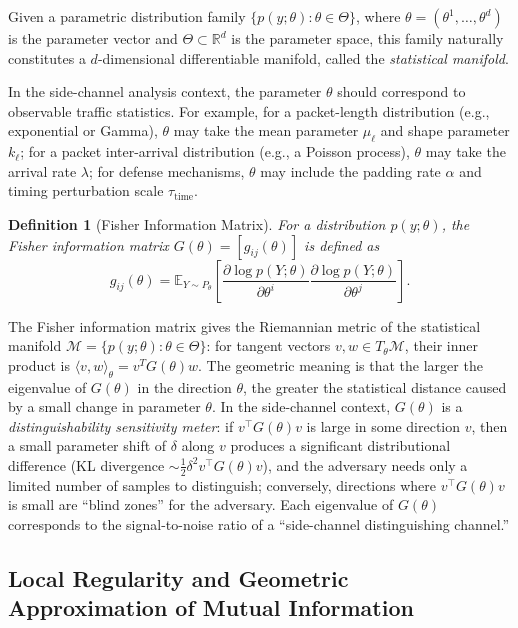 \documentclass[lettersize,journal]{IEEEtran}
\newtheorem{definition}{Definition}
\newcommand{\E}{\mathbb{E}}
\newcommand{\R}{\mathbb{R}}
\begin{document}
Given a parametric distribution family
$\{p(y;\theta) : \theta\in\Theta\}$, where
$\theta=(\theta^1,\ldots,\theta^d)$ is the parameter vector and
$\Theta\subset\R^d$ is the parameter space, this family naturally
constitutes a $d$-dimensional differentiable manifold, called the
\emph{statistical manifold}.

In the side-channel analysis context, the parameter $\theta$ should
correspond to observable traffic statistics.
For example, for a packet-length distribution (e.g., exponential or Gamma),
$\theta$ may take the mean parameter $\mu_{\ell}$ and shape parameter
$k_{\ell}$; for a packet inter-arrival distribution (e.g., a Poisson
process), $\theta$ may take the arrival rate $\lambda$; for defense
mechanisms, $\theta$ may include the padding rate $\alpha$ and timing
perturbation scale $\tau_{\mathrm{time}}$.

\begin{definition}[Fisher Information Matrix]\label{def:fim}
For a distribution $p(y;\theta)$, the Fisher information matrix
$G(\theta)=[g_{ij}(\theta)]$ is defined as
\begin{equation}\label{eq:fim}
g_{ij}(\theta) = \E_{Y\sim P_\theta}\!\left[\frac{\partial\log p(Y;\theta)}{\partial\theta^i}
\frac{\partial\log p(Y;\theta)}{\partial\theta^j}\right].
\end{equation}
\end{definition}

The Fisher information matrix gives the Riemannian metric of the
statistical manifold
$\mathcal{M}=\{p(y;\theta):\theta\in\Theta\}$:
for tangent vectors $v,w\in T_\theta\mathcal{M}$, their inner product is
$\langle v,w\rangle_\theta = v^T G(\theta) w$.
The geometric meaning is that the larger the eigenvalue of $G(\theta)$ in
the direction $\theta$, the greater the statistical distance caused by a
small change in parameter $\theta$.
In the side-channel context, $G(\theta)$ is a \emph{distinguishability
sensitivity meter}: if $v^\top G(\theta)v$ is large in some direction $v$,
then a small parameter shift of $\delta$ along $v$ produces a significant
distributional difference (KL divergence $\sim\frac{1}{2}\delta^2 v^\top G(\theta)v$),
and the adversary needs only a limited number of samples to distinguish;
conversely, directions where $v^\top G(\theta)v$ is small are ``blind
zones'' for the adversary.
Each eigenvalue of $G(\theta)$ corresponds to the signal-to-noise ratio
of a ``side-channel distinguishing channel.''

\subsection{Local Regularity and Geometric Approximation of Mutual Information}
\end{document}
